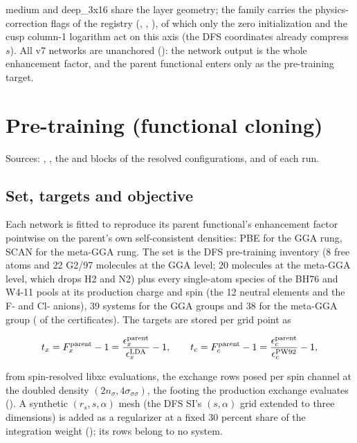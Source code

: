 \documentclass[10pt,a4paper]{article}
\begin{document}
medium and deep\_3x16 share the layer geometry; the  family carries the
physics-correction flags of the registry (, ,
), of which only the zero initialization and the cusp column-1 logarithm
act on this axis (the DFS coordinates already compress $s$). All v7 networks are unanchored
(): the network output is the whole enhancement factor, and the
parent functional enters only as the pre-training target.


\section{Pre-training (functional cloning)}

Sources: , , the  and
 blocks of the resolved configurations,  and
 of each run.

\subsection{Set, targets and objective}

Each network is fitted to reproduce its parent functional's enhancement factor pointwise on the
parent's own self-consistent densities: PBE for the GGA rung, SCAN for the meta-GGA rung. The set
is the DFS pre-training inventory (8 free atoms and 22 G2/97 molecules at the GGA level; 20
molecules at the meta-GGA level, which drops H2 and N2) plus every single-atom species of the
BH76 and W4-11 pools at its production charge and spin (the 12 neutral elements and the F- and
Cl- anions), 39 systems for the GGA groups and 38 for the meta-GGA group ( of the
certificates). The targets are stored per grid point as

\[
t_x = F_x^{\rm parent} - 1 = \frac{\epsilon_x^{\rm parent}}{\epsilon_x^{\rm LDA}} - 1, \qquad
t_c = F_c^{\rm parent} - 1 = \frac{\epsilon_c^{\rm parent}}{\epsilon_c^{\rm PW92}} - 1,
\]

from spin-resolved libxc evaluations, the exchange rows posed per spin channel at the doubled
density $(2 n_\sigma, 4\sigma_{\sigma\sigma})$, the footing the production exchange evaluates
(). A synthetic $(r_s, s, \alpha)$ mesh (the DFS SI's $(s,
\alpha)$ grid extended to three dimensions) is added as a regularizer at a fixed 30 percent share
of the integration weight (); its rows belong to no system.
\end{document}
